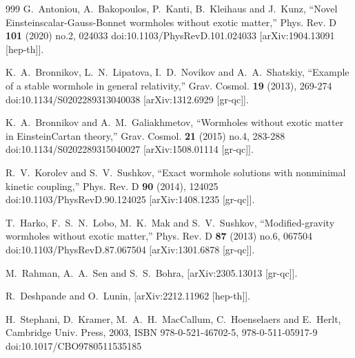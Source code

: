 \documentclass[aps,preprint,groupedaddress,nofootinbib,superscriptaddress,showkeys,showpacs,eqsecnum,amsmath,amssymb]{revtex4-1}
\begin{document}
\begin{thebibliography}{999}
G.~Antoniou, A.~Bakopoulos, P.~Kanti, B.~Kleihaus and J.~Kunz,
``Novel Einstein\textendash{}scalar-Gauss-Bonnet wormholes without exotic matter,''
Phys. Rev. D \textbf{101} (2020) no.2, 024033
doi:10.1103/PhysRevD.101.024033
[arXiv:1904.13091 [hep-th]].



K.~A.~Bronnikov, L.~N.~Lipatova, I.~D.~Novikov and A.~A.~Shatskiy,
``Example of a stable wormhole in general relativity,''
Grav. Cosmol. \textbf{19} (2013), 269-274
doi:10.1134/S0202289313040038
[arXiv:1312.6929 [gr-qc]].

K.~A.~Bronnikov and A.~M.~Galiakhmetov,
``Wormholes without exotic matter in Einstein\textendash{}Cartan theory,''
Grav. Cosmol. \textbf{21} (2015) no.4, 283-288
doi:10.1134/S0202289315040027
[arXiv:1508.01114 [gr-qc]].


R.~V.~Korolev and S.~V.~Sushkov,
``Exact wormhole solutions with nonminimal kinetic coupling,''
Phys. Rev. D \textbf{90} (2014), 124025
doi:10.1103/PhysRevD.90.124025
[arXiv:1408.1235 [gr-qc]].


T.~Harko, F.~S.~N.~Lobo, M.~K.~Mak and S.~V.~Sushkov,
``Modified-gravity wormholes without exotic matter,''
Phys. Rev. D \textbf{87} (2013) no.6, 067504
doi:10.1103/PhysRevD.87.067504
[arXiv:1301.6878 [gr-qc]].

M.~Rahman, A.~A.~Sen and S.~S.~Bohra,
[arXiv:2305.13013 [gr-qc]].

R.~Deshpande and O.~Lunin,
[arXiv:2212.11962 [hep-th]].


H.~Stephani, D.~Kramer, M.~A.~H.~MacCallum, C.~Hoenselaers and E.~Herlt,
Cambridge Univ. Press, 2003,
ISBN 978-0-521-46702-5, 978-0-511-05917-9
doi:10.1017/CBO9780511535185


\end{thebibliography}
\end{document}
